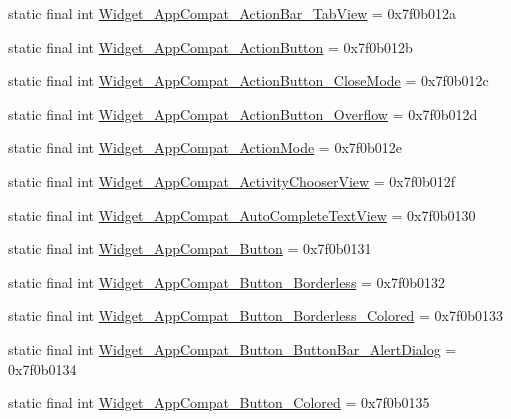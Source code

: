 \begin{CompactItemize}
static final int \hyperlink{classandroid_1_1support_1_1v7_1_1cardview_1_1_r_1_1style_deeb2860ba793c6b065eb0c56c77eab8}{Widget\_\-AppCompat\_\-ActionBar\_\-TabView} = 0x7f0b012a
\item 
static final int \hyperlink{classandroid_1_1support_1_1v7_1_1cardview_1_1_r_1_1style_6e81430c004b962b1bb0cfa1276238b3}{Widget\_\-AppCompat\_\-ActionButton} = 0x7f0b012b
\item 
static final int \hyperlink{classandroid_1_1support_1_1v7_1_1cardview_1_1_r_1_1style_644031d55ca62e2f1cb6145292ec90de}{Widget\_\-AppCompat\_\-ActionButton\_\-CloseMode} = 0x7f0b012c
\item 
static final int \hyperlink{classandroid_1_1support_1_1v7_1_1cardview_1_1_r_1_1style_3119faed4731c525b741803def780252}{Widget\_\-AppCompat\_\-ActionButton\_\-Overflow} = 0x7f0b012d
\item 
static final int \hyperlink{classandroid_1_1support_1_1v7_1_1cardview_1_1_r_1_1style_c65e7e7b0efff00d628fcb3220cedef1}{Widget\_\-AppCompat\_\-ActionMode} = 0x7f0b012e
\item 
static final int \hyperlink{classandroid_1_1support_1_1v7_1_1cardview_1_1_r_1_1style_cbae28f3a97de1d9fe0fbd50f3b086ca}{Widget\_\-AppCompat\_\-ActivityChooserView} = 0x7f0b012f
\item 
static final int \hyperlink{classandroid_1_1support_1_1v7_1_1cardview_1_1_r_1_1style_b4c340d7127aacd49b90ad157a8b5682}{Widget\_\-AppCompat\_\-AutoCompleteTextView} = 0x7f0b0130
\item 
static final int \hyperlink{classandroid_1_1support_1_1v7_1_1cardview_1_1_r_1_1style_938c1a11cb293e567d10c57cd15c5057}{Widget\_\-AppCompat\_\-Button} = 0x7f0b0131
\item 
static final int \hyperlink{classandroid_1_1support_1_1v7_1_1cardview_1_1_r_1_1style_ff63f099f79351805a48a83c8722fcb8}{Widget\_\-AppCompat\_\-Button\_\-Borderless} = 0x7f0b0132
\item 
static final int \hyperlink{classandroid_1_1support_1_1v7_1_1cardview_1_1_r_1_1style_264390260ae5fa4e6d13f3c6e556ca51}{Widget\_\-AppCompat\_\-Button\_\-Borderless\_\-Colored} = 0x7f0b0133
\item 
static final int \hyperlink{classandroid_1_1support_1_1v7_1_1cardview_1_1_r_1_1style_827adb331d9cf5650af72a05fb3be558}{Widget\_\-AppCompat\_\-Button\_\-ButtonBar\_\-AlertDialog} = 0x7f0b0134
\item 
static final int \hyperlink{classandroid_1_1support_1_1v7_1_1cardview_1_1_r_1_1style_aa21ed3b1bcb538b653883c6d66516da}{Widget\_\-AppCompat\_\-Button\_\-Colored} = 0x7f0b0135

\end{CompactItemize}

